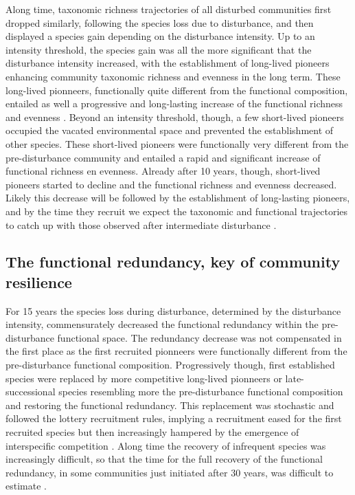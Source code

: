 \documentclass[fleqn,10pt]{ArtEcoFoG} %
\begin{document}
Along time, taxonomic richness trajectories of all disturbed communities
first dropped similarly, following the species loss due to disturbance,
and then displayed a species gain depending on the disturbance
intensity. Up to an intensity threshold, the species gain was all the
more significant that the disturbance intensity increased, with the
establishment of long-lived pioneers enhancing community taxonomic
richness and evenness in the long term. These long-lived pionneers,
functionally quite different from the functional composition, entailed
as well a progressive and long-lasting increase of the functional
richness and evenness \citep{Denslow1980, Molino2001}. Beyond an
intensity threshold, though, a few short-lived pioneers occupied the
vacated environmental space and prevented the establishment of other
species. These short-lived pioneers were functionally very different
from the pre-disturbance community and entailed a rapid and significant
increase of functional richness en evenness. Already after 10 years,
though, short-lived pioneers started to decline and the functional
richness and evenness decreased. Likely this decrease will be followed
by the establishment of long-lasting pioneers, and by the time they
recruit we expect the taxonomic and functional trajectories to catch up
with those observed after intermediate disturbance \citep{Walker2009}.

\subsection{The functional redundancy, key of community
resilience}\label{the-functional-redundancy-key-of-community-resilience}

For 15 years the species loss during disturbance, determined by the
disturbance intensity, commensurately decreased the functional
redundancy within the pre-disturbance functional space. The redundancy
decrease was not compensated in the first place as the first recruited
pionneers were functionally different from the pre-disturbance
functional composition. Progressively though, first established species
were replaced by more competitive long-lived pionneers or
late-successional species resembling more the pre-disturbance functional
composition and restoring the functional redundancy. This replacement
was stochastic and followed the lottery recruitment rules, implying a
recruitment eased for the first recruited species but then increasingly
hampered by the emergence of interspecific competition
\citep{Busing2002}. Along time the recovery of infrequent species was
increasingly difficult, so that the time for the full recovery of the
functional redundancy, in some communities just initiated after 30
years, was difficult to estimate \citep{Elmqvist2003, Diaz2005}.
\end{document}
